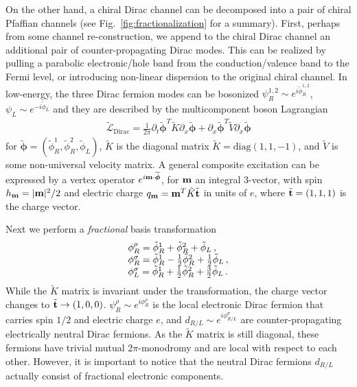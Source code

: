 On the other hand, a chiral Dirac channel can be decomposed into a pair of chiral Pfaffian channels (see Fig.~\ref{fig:fractionalization} for a summary). First, perhaps from some channel re-construction, we append to the chiral Dirac channel an additional pair of counter-propagating Dirac modes. This can be realized by pulling a parabolic electronic/hole band from the conduction/valence band to the Fermi level, or introducing non-linear dispersion to the original chiral channel. In low-energy, the three Dirac fermion modes can be bosonized $\psi^{1,2}_R\sim e^{i\tilde\phi_R^{1,2}}$, $\psi_L\sim e^{-i\tilde\phi_L}$ and they are described by the multicomponent boson Lagrangian \begin{align}\widetilde{\mathcal{L}}_{\mathrm{Dirac}}=\frac{1}{2\pi}\partial_t\widetilde{\boldsymbol\phi}^T\tilde{K}\partial_x\widetilde{\boldsymbol\phi}+\partial_x\widetilde{\boldsymbol\phi}^T\tilde{V}\partial_x\widetilde{\boldsymbol\phi}\label{3Dirac}\end{align} for $\widetilde{\boldsymbol\phi}=(\tilde\phi_R^1,\tilde\phi_R^2,\tilde\phi_L)$, $\tilde{K}$ is the diagonal matrix $\tilde{K}=\mathrm{diag}(1,1,-1)$, and $\tilde{V}$ is some non-universal velocity matrix. A general composite excitation can be expressed by a vertex operator $e^{i{\bf m}\cdot\widetilde{\boldsymbol\phi}}$, for ${\bf m}$ an integral 3-vector, with spin $h_{\bf m}=|{\bf m}|^2/2$ and electric charge $q_{\bf m}={\bf m}^T\tilde{K}\tilde{\bf t}$ in units of $e$, where $\tilde{\bf t}=(1,1,1)$ is the charge vector.

Next we perform a {\em fractional} basis transformation \begin{align}\begin{array}{*{20}l}\phi^\rho_R=\tilde\phi^1_R+\tilde\phi^2_R+\tilde\phi_L \,, \\\phi^\sigma_R=\tilde\phi^1_R-\frac{1}{2}\tilde\phi^2_R+\frac{1}{2}\tilde\phi_L \,,\\\phi^\sigma_L=\tilde\phi^1_R+\frac{1}{2}\tilde\phi^2_R+\frac{3}{2}\tilde\phi_L \,.\end{array}\label{fracbasistrans0}\end{align} While the $\tilde{K}$ matrix is invariant under the transformation, the charge vector changes to $\tilde{\bf t}\to(1,0,0)$. $\psi^\rho_R\sim e^{i\phi^\rho_R}$ is the local electronic Dirac fermion that carries spin $1/2$ and electric charge $e$, and $d_{R/L}\sim e^{i\phi^\sigma_{R/L}}$ are counter-propagating electrically neutral Dirac fermions. As the $\tilde{K}$ matrix is still diagonal, these fermions have trivial mutual $2\pi$-monodromy and are local with respect to each other. However, it is important to notice that the neutral Dirac fermions $d_{R/L}$ actually consist of fractional electronic components.

